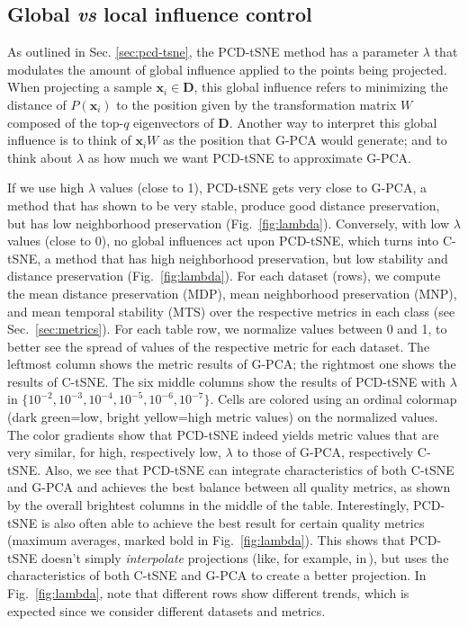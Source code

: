 \subsection{Global \emph{vs} local influence control}
\label{sec:lambda}

As outlined in Sec. \ref{sec:pcd-tsne}, the PCD-tSNE method has a parameter $\lambda$ that modulates the amount of global influence applied to the points being projected. 
When projecting a sample $\mathbf{x}_i \in \mathbf{D}$, this global influence refers to minimizing the distance of $P(\mathbf{x}_i)$ to the position given by the transformation matrix $W$ composed of the top-$q$ eigenvectors of $\mathbf{D}$. 
Another way to interpret this global influence is to think of $\mathbf{x}_{i} W$ as the position that G-PCA would generate; and to think about $\lambda$ as how much we want PCD-tSNE to approximate G-PCA.

If we use high $\lambda$ values (close to 1), PCD-tSNE gets very close to G-PCA, a method that has shown to be very stable, produce good distance preservation, but has low neighborhood preservation (Fig.~\ref{fig:lambda}). Conversely, 
with low $\lambda$ values (close to 0), no global influences act upon PCD-tSNE, which turns into C-tSNE, a method that has high neighborhood preservation, but low stability and distance preservation (Fig.~\ref{fig:lambda}). 
For each dataset (rows), we compute the mean distance preservation (MDP), mean neighborhood preservation (MNP), and mean temporal stability (MTS) over the respective metrics in each class (see Sec.~\ref{sec:metrics}). For each table row, we normalize values between 0 and 1, to better see the spread of values of the respective metric for each dataset.
The leftmost column shows the metric results of G-PCA; the rightmost one shows the results of C-tSNE. The six middle columns
show the results of PCD-tSNE with $\lambda$ in $\{10^{-2}, 10^{-3}, 10^{-4}, 10^{-5}, 10^{-6}, 10^{-7}\}$. Cells are colored using an ordinal colormap (dark green=low, bright yellow=high metric values) on the normalized values. The color gradients show that PCD-tSNE indeed yields metric values that are very similar, for high, respectively low, $\lambda$ to those of G-PCA, respectively C-tSNE. Also, we see that PCD-tSNE can integrate characteristics of both C-tSNE and G-PCA and achieves the best balance between all quality metrics, as shown by the overall brightest columns in the middle of the table. Interestingly, PCD-tSNE is also often able to achieve the best result for certain quality metrics (maximum averages, marked bold in Fig.~\ref{fig:lambda}). This shows that PCD-tSNE doesn't simply \emph{interpolate} projections (like, for example, in\,\cite{kruiger_mdpi}), but uses the characteristics of both C-tSNE and G-PCA to create a better projection. In Fig.~\ref{fig:lambda}, note that different rows show different trends, which is expected since we consider different datasets and metrics. 

